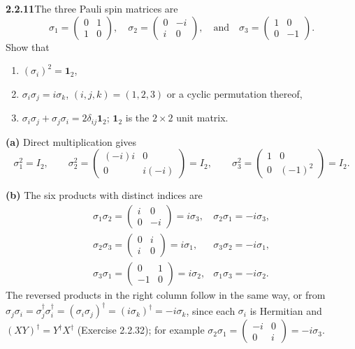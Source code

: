 \par\bigskip
\noindent\textbf{2.2.11}\quad The three Pauli spin matrices are
\[
\sigma_{1}=\begin{pmatrix}0&1\\1&0\end{pmatrix},\quad
\sigma_{2}=\begin{pmatrix}0&-i\\i&0\end{pmatrix},\quad\text{and}\quad
\sigma_{3}=\begin{pmatrix}1&0\\0&-1\end{pmatrix}.
\]
Show that
\begin{enumerate}
\item[(a)] $(\sigma_{i})^{2}=\mathbf{1}_{2}$,
\item[(b)] $\sigma_{i}\sigma_{j}=i\sigma_{k}$, $(i,j,k)=(1,2,3)$ or a cyclic
  permutation thereof,
\item[(c)] $\sigma_{i}\sigma_{j}+\sigma_{j}\sigma_{i}=2\delta_{ij}
  \mathbf{1}_{2}$; $\mathbf{1}_{2}$ is the $2\times2$ unit matrix.
\end{enumerate}
\solution
\textbf{(a)} Direct multiplication gives
\[
\sigma_1^2=I_2,\qquad
\sigma_2^2=\begin{pmatrix}(-i)i&0\\0&i(-i)\end{pmatrix}=I_2,\qquad
\sigma_3^2=\begin{pmatrix}1&0\\0&(-1)^2\end{pmatrix}=I_2.
\]

\textbf{(b)} The six products with distinct indices are
\[
\begin{array}{ll}
\sigma_1\sigma_2=\begin{pmatrix}i&0\\0&-i\end{pmatrix}=i\sigma_3,
&\sigma_2\sigma_1=-i\sigma_3,\\[3pt]
\sigma_2\sigma_3=\begin{pmatrix}0&i\\i&0\end{pmatrix}=i\sigma_1,
&\sigma_3\sigma_2=-i\sigma_1,\\[3pt]
\sigma_3\sigma_1=\begin{pmatrix}0&1\\-1&0\end{pmatrix}=i\sigma_2,
&\sigma_1\sigma_3=-i\sigma_2.
\end{array}
\]
The reversed products in the right column follow in the same way, or
from $\sigma_j\sigma_i=\sigma_j^\dagger\sigma_i^\dagger
=(\sigma_i\sigma_j)^\dagger=(i\sigma_k)^\dagger=-i\sigma_k$, since each
$\sigma_i$ is Hermitian and $(XY)^\dagger=Y^\dagger X^\dagger$
(Exercise 2.2.32); for example
$\sigma_2\sigma_1=\begin{pmatrix}-i&0\\0&i\end{pmatrix}=-i\sigma_3$.

